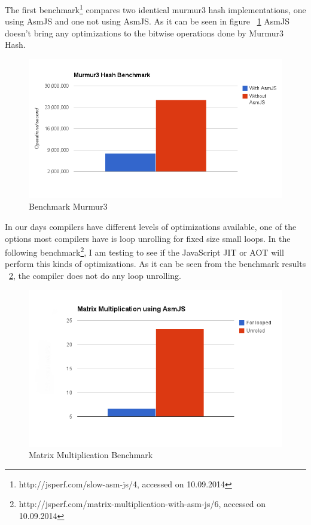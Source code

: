 The first benchmark\footnote{http://jsperf.com/slow-asm-js/4, accessed on 10.09.2014} compares two identical murmur3 hash implementations, one using AsmJS and one not using AsmJS. 
As it can be seen in figure ~\ref{img:murmur3} AsmJS doesn't bring any optimizations to the bitwise operations done by Murmur3 Hash.
\begin{center}
	\begin{figure}[here!]
		\includegraphics[width=\textwidth]{src/img/murmur3.png}
		\caption{Benchmark Murmur3}
		\label{img:murmur3}
	\end{figure}
\end{center}
In our days compilers have different levels of optimizations available, one of the options most compilers have is loop unrolling for fixed size small loops. In the following benchmark\footnote{http://jsperf.com/matrix-multiplication-with-asm-js/6, accessed on 10.09.2014}, I am testing to see if the JavaScript JIT or AOT will perform this kinds of optimizations.
As it can be seen from the benchmark results ~\ref{img:matrix-mul}, the compiler does not do any loop unrolling.
\begin{center}
	\begin{figure}[here!]
		\includegraphics[width=\textwidth]{src/img/matrix-mult.png}
		\caption{Matrix Multiplication Benchmark}
		\label{img:matrix-mul}
	\end{figure}
\end{center}

